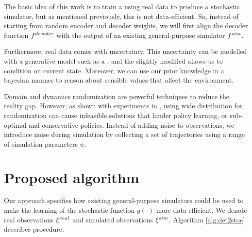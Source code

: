 The basic idea of this work is to train a \cvae{} using real data to produce a stochastic simulator, but as mentioned previously, this is not data-efficient. So, instead of starting from random encoder and decoder weights, we will first align the decoder function $f^{decoder}{}$ with the output of an existing general-purpose simulator $f^{sim}{}$.

Furthermore, real data comes with uncertainty. This uncertainty can be modelled with a generative model such as a \vae{}, and the slightly modified \cvae{} allows us to condition on current state. Moreover, we can use our prior knowledge in a bayesian manner to reason about sensible values that affect the environment.

Domain and dynamics randomization are powerful techniques to reduce the reality gap. However, as shown with experiments in \parencite{Chebotar2018}, using wide distribution for randomization can cause infeasible solutions that hinder policy learning, or sub-optimal and conservative policies. Instead of adding noise to observations, we introduce noise during simulation by collecting a set of trajectories using a range of simulation parameters $\psi$. 


\section{Proposed \dettostoc{} algorithm}
\label{det2stoc:algorithm}

Our approach specifies how existing general-purpose simulators could be used to make the learning of the stochastic function $g(\cdot)$ more data efficient. We denote real observations $\xi^{real}$ and simulated observations $\xi^{sim}$. Algorithm \ref{alg:det2stoc} describes \dettostoc{} procedure.

